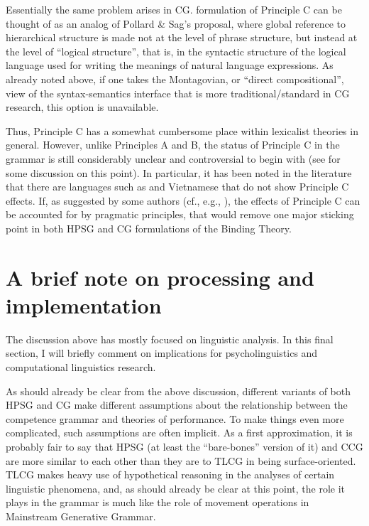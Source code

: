 \documentclass[output=paper,biblatex,babelshorthands,newtxmath,draftmode,colorlinks,citecolor=brown]{langscibook}
\begin{document}
Essentially the same problem arises in CG.  formulation
of Principle C can be thought of as an analog of Pollard \&
Sag's \citeyearpar{PS92a,ps2} proposal,
where global reference to hierarchical structure is made not at the
level of phrase structure, but instead at the level of
``logical structure'', that is, in the syntactic structure of the logical
language used for writing the meanings of natural language
expressions. As already noted above, if one takes the Montagovian, or
``direct compositional'', view of the syntax-semantics interface that is
more traditional/standard in CG research, this option is unavailable.


Thus, Principle C has a somewhat cumbersome place within lexicalist
theories in general. However, unlike Principles A and B, the status of
Principle C in the grammar is still considerably unclear and
controversial to begin with (see \citealt[122--124]{buringbinding} for
some discussion on this point). In particular, it has been noted in
the literature \citep{lasnik86} that there are languages such as 
and Vietnamese that do not show Principle C effects. If, as suggested
by some authors (cf., e.g., \citealt{levinson87,levinson91}), the
effects of Principle C can be accounted for by pragmatic principles,
that would remove one major sticking point in both HPSG and CG
formulations of the Binding Theory.

\section{A brief note on processing and implementation \label{implementation}}

The discussion above has mostly focused on linguistic analysis. In
this final section, I will briefly comment on implications for
psycholinguistics and computational linguistics research.

As should already be clear from the above discussion, different
variants of both HPSG and CG make different assumptions
about the relationship between the competence grammar and theories of
performance. To make things even more complicated, such assumptions
are often implicit. As a first approximation, it is probably fair to
say that HPSG (at least the ``bare-bones'' version of it) and CCG are
more similar to each other than they are to TLCG in being
surface-oriented. TLCG makes heavy use of hypothetical reasoning in
the analyses of certain linguistic phenomena, and, as should already
be clear at this point, the role it plays in the grammar is much like
the role of movement operations in Mainstream Generative Grammar.
\end{document}

